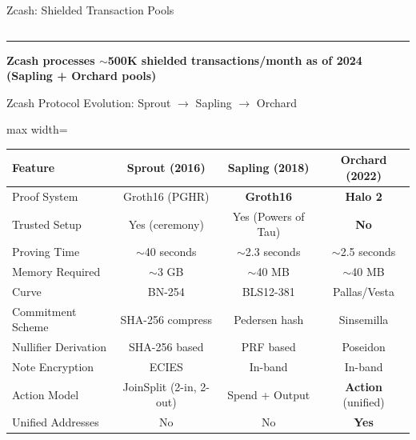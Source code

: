 \documentclass[8pt,aspectratio=169]{beamer}
\newcommand{\bottomnote}[1]{\vfill\vspace{-2mm}\textcolor{mllavender2}{\rule{\textwidth}{0.4pt}}\vspace{1mm}\footnotesize\textbf{#1}}
\begin{document}
\begin{frame}{Zcash: Shielded Transaction Pools}
\begin{columns}[T]
\begin{center}
\end{center}
\end{columns}
\bottomnote{Zcash processes $\sim$500K shielded transactions/month as of 2024 (Sapling + Orchard pools)}
\end{frame}

\begin{frame}{Zcash Protocol Evolution: Sprout $\to$ Sapling $\to$ Orchard}
\footnotesize
\begin{center}
\begin{adjustbox}{max width=\textwidth}
\begin{tabular}{l c c c}
\toprule
\textbf{Feature} & \textbf{Sprout (2016)} & \textbf{Sapling (2018)} & \textbf{Orchard (2022)} \\
\midrule
Proof System & Groth16 (PGHR) & \textbf{Groth16} & \textbf{Halo 2} \\
Trusted Setup & Yes (ceremony) & Yes (Powers of Tau) & \textcolor{mlgreen}{\textbf{No}} \\
Proving Time & $\sim$40 seconds & $\sim$2.3 seconds & $\sim$2.5 seconds \\
Memory Required & $\sim$3 GB & $\sim$40 MB & $\sim$40 MB \\
Curve & BN-254 & BLS12-381 & Pallas/Vesta \\
Commitment Scheme & SHA-256 compress & Pedersen hash & Sinsemilla \\
Nullifier Derivation & SHA-256 based & PRF based & Poseidon \\
Note Encryption & ECIES & In-band & In-band \\
Action Model & JoinSplit (2-in, 2-out) & Spend + Output & \textbf{Action} (unified) \\
Unified Addresses & No & No & \textcolor{mlgreen}{\textbf{Yes}} \\
\bottomrule
\end{tabular}
\end{adjustbox}
\end{center}
\vspace{0.2cm}

\end{frame}
\end{document}
